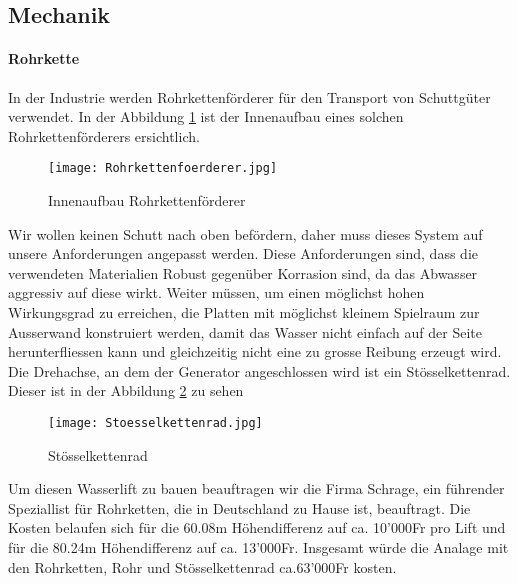 \newpage


\subsection{Mechanik}

\paragraph{Rohrkette}

In der Industrie werden Rohrkettenförderer für den Transport von Schuttgüter verwendet. In der Abbildung \ref{fig:Rohrkettenfoerderer}  ist der Innenaufbau eines solchen Rohrkettenförderers ersichtlich.

\begin{figure} [H]
	\centering
	\texttt{[image: Rohrkettenfoerderer.jpg]}
	\caption{Innenaufbau Rohrkettenförderer \cite{abconvey}}
	\label{fig:Rohrkettenfoerderer}
\end{figure}

Wir wollen keinen Schutt nach oben befördern, daher muss dieses System auf unsere Anforderungen angepasst werden. Diese Anforderungen sind, dass die verwendeten Materialien Robust gegenüber Korrasion sind, da das Abwasser aggressiv auf diese wirkt. Weiter müssen, um einen möglichst hohen Wirkungsgrad zu erreichen, die Platten mit möglichst kleinem Spielraum zur Ausserwand konstruiert werden, damit das Wasser nicht einfach auf der Seite herunterfliessen kann und gleichzeitig nicht eine zu grosse Reibung erzeugt wird. Die Drehachse, an dem der Generator angeschlossen wird ist ein Stösselkettenrad. Dieser ist in der Abbildung \ref{fig:stoesselkettenrad}  zu sehen

\begin{figure} [H]
	\centering
	\texttt{[image: Stoesselkettenrad.jpg]}
	\caption{Stösselkettenrad \cite{schrage}}
	\label{fig:stoesselkettenrad}
\end{figure}


Um diesen Wasserlift zu bauen beauftragen wir die Firma Schrage, ein führender Speziallist für Rohrketten, die in Deutschland zu Hause ist, beauftragt. Die Kosten belaufen sich für die 60.08\si{m} Höhendifferenz auf ca. 10'000\si{Fr} pro Lift und für die 80.24\si{m} Höhendifferenz auf ca. 13'000\si{Fr}. Insgesamt würde die Analage mit den Rohrketten, Rohr und Stösselkettenrad ca.63'000\si{Fr} kosten. \cite{schrage}

\newpage

